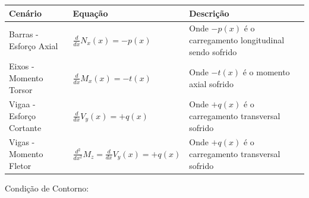 \documentclass{article}
\begin{document}
\begin{table}[h]\tiny

    \begin{tabularx}{\textwidth}{|X|X|X|}\hline
        \textbf{Cenário}                         & \textbf{Equação}                                   & \textbf{Descrição}                                       \\ \hline
        \rule{0pt}{4ex} Barras - Esforço Axial   & $\frac{d}{dx}N_x(x) = -p(x)$                       & Onde $-p(x)$ é o carregamento longitudinal sendo sofrido \\[2ex]  \hline
        \rule{0pt}{4ex} Eixos - Momento Torsor   & $\frac{d}{dx}M_x(x) = -t(x)$                       & Onde $-t(x)$ é o momento axial sofrido                   \\[2ex]\hline
        \rule{0pt}{4ex} Vigaa - Esforço Cortante & $\frac{d}{dx}V_y(x) = +q(x)$                       & Onde $+q(x)$ é o carregamento transversal sofrido        \\[2ex] \hline
        \rule{0pt}{4ex} Vigas - Momento Fletor   & $\frac{d^2}{dx^2}M_z = \frac{d}{dx}V_y(x) = +q(x)$ & Onde $+q(x)$ é o carregamento transversal sofrido        \\[2ex] \hline
    \end{tabularx}

\end{table}
Condição de Contorno:
\end{document}
